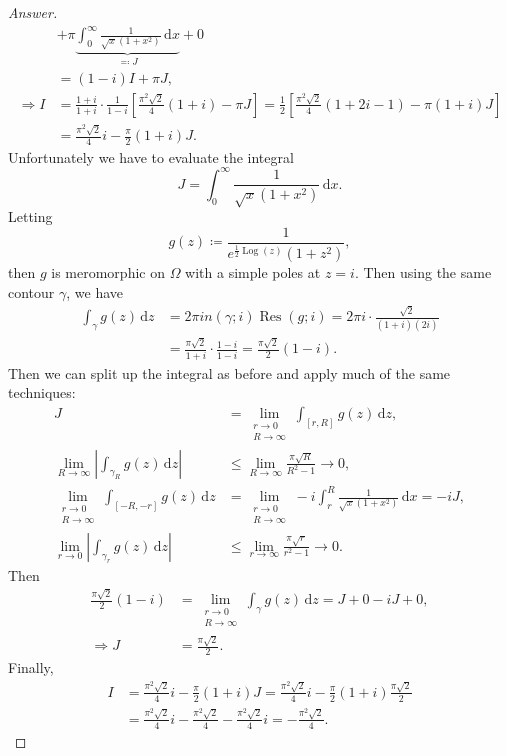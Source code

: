 \documentclass[12pt]{article}
\newcommand\paren[1]{\left( #1 \right)}
\newcommand{\sqbrack}[1]{\left [ #1 \right ]}
\newcommand{\abs}[1]{\left| #1 \right|}
\renewcommand{\i}[4]{\int_{#1}^{#2} {#3} \, \mathrm{d} {#4} }
\theoremstyle{definition}
\DeclareMathOperator\Log{Log}
\DeclareMathOperator\Res{Res}
\begin{document}
\begin{proof}[Answer]
\begin{align*}
        & + \pi \underbrace{ \i{0}{\infty}{ \frac{1}{\sqrt{x}\paren{1+x^2}} }{x} }_{\eqqcolon J} + 0 \\ 
        & = (1 - i) I + \pi J , \\ 
        \Rightarrow I & = \frac{1 + i}{1+ i} \cdot \frac{1}{1 - i} \sqbrack{ \frac{\pi^2 \sqrt{2}}{4} (1 + i) - \pi J }  = \frac{1}{2} \sqbrack{ \frac{\pi^2\sqrt{2}}{4} (1 + 2i - 1) -\pi(1 + i) J } \\ 
        & = \frac{\pi^2 \sqrt{2}}{4} i - \frac{\pi }{2} (1 + i) J .
    \end{align*}
    Unfortunately we have to evaluate the integral 
    \[
        J = \i{0}{\infty}{ \frac{1}{\sqrt{x}\paren{1+x^2}}}{x} .
    \]
    Letting 
    \[
        g(z) \coloneqq \frac{1}{ e^{ \frac{1}{2} \Log(z) } \paren{ 1 + z^2 } } , 
    \]
    then $g$ is meromorphic on $\Omega$ with a simple poles at $z = i$. Then using the same contour $\gamma$, we have 
    \begin{align*}
        \i{\gamma}{}{g(z)}{z} & = 2\pi i n(\gamma;i) \Res(g;i) = 2\pi i \cdot \frac{\sqrt{2}}{(1+i)(2i)} \\ 
        & = \frac{\pi\sqrt{2}}{1 + i} \cdot \frac{1 - i}{1 - i} = \frac{\pi \sqrt{2}}{2}(1 - i) . 
    \end{align*}
    Then we can split up the integral as before and apply much of the same techniques: 
    \begin{align*}
        J & = \lim\limits_{ \substack{ r \to 0 \\ R \to \infty } }\i{[r,R]}{}{g(z)}{z} , \\ 
        \lim\limits_{R \to \infty} \abs{ \i{\gamma_R}{}{g(z)}{z} } & \leq \lim\limits_{R \to \infty} \frac{\pi \sqrt{R}}{R^2 - 1} \to 0 , \\ 
        \lim\limits_{ \substack{ r \to 0 \\ R \to \infty } } \i{[-R,-r]}{}{g(z)}{z} & = \lim\limits_{ \substack{ r \to 0 \\ R \to \infty } } -i \i{r}{R}{ \frac{1}{\sqrt{x}\paren{1+x^2}} }{x} = -i J , \\ 
        \lim\limits_{r \to 0} \abs{ \i{\gamma_r}{}{g(z)}{z} } & \leq \lim\limits_{r \to \infty} \frac{\pi \sqrt{r}}{r^2 - 1} \to 0 . 
    \end{align*}
    Then 
    \begin{align*}
        \frac{\pi \sqrt{2}}{2}(1 - i) & = \lim\limits_{ \substack{ r \to 0 \\ R \to \infty } }\i{\gamma}{}{g(z)}{z} = J + 0 -iJ + 0 , \\ 
        \Rightarrow J & = \frac{\pi \sqrt{2}}{2} . 
    \end{align*}
    Finally, 
    \begin{align*}
        I & = \frac{\pi^2 \sqrt{2}}{4} i - \frac{\pi }{2} (1 + i) J = \frac{\pi^2 \sqrt{2}}{4} i - \frac{\pi }{2} (1 + i) \frac{\pi \sqrt{2}}{2} \\ 
        & = \frac{\pi^2 \sqrt{2}}{4} i - \frac{\pi^2 \sqrt{2}}{4} - \frac{\pi^2 \sqrt{2}}{4} i = \boxed{ - \frac{\pi^2 \sqrt{2}}{4} . }
    \end{align*}
\end{proof}
\end{document}
